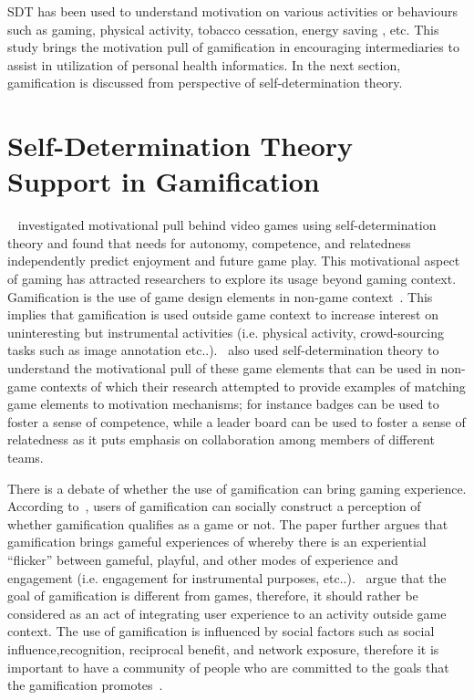 SDT has been used to understand motivation on various activities or behaviours such as gaming\citep{ryan2006:motivationalpull}, physical activity\citep{power2011:obesity}, tobacco cessation\citep{williams2006:testing}, energy saving \citep{webb2013:self}, etc. This study brings the motivation pull of gamification in encouraging intermediaries to assist in utilization of personal health informatics. In the next section, gamification is discussed from perspective of self-determination theory.
\section{Self-Determination Theory Support in Gamification}
~\cite{ryan2006:motivationalpull} investigated motivational pull behind video games using self-determination theory and found that needs for autonomy, competence, and relatedness independently predict enjoyment and future game play. This motivational aspect of gaming has attracted researchers to explore its usage beyond gaming context. Gamification is the use of game design elements in non-game context~\citep{deterding2011game}. This implies that gamification is used outside game context to increase interest on uninteresting but instrumental activities (i.e. physical activity, crowd-sourcing tasks such as image annotation etc..).~\cite{sailer2013:psychological} also used self-determination theory to understand the motivational pull of these game elements that can be used in non-game contexts of which their research attempted to provide examples of matching game elements to motivation mechanisms; for instance badges can be used to foster a sense of competence, while a leader board can be used to foster a sense of relatedness as it puts emphasis on collaboration among members of different teams.

There is a debate of whether the use of gamification can bring gaming experience. According to~\cite{deterding2011game}, users of gamification can socially construct a perception of whether gamification qualifies as a game or not. The paper further argues that gamification brings gameful experiences of whereby there is an experiential ``flicker'' between gameful, playful, and other modes of experience and engagement (i.e. engagement for instrumental purposes, etc..).~\cite{seaborn2015:gamification} argue that the goal of gamification is different from games, therefore, it should rather be considered as an act of integrating user experience to an activity outside game context. The use of gamification is influenced by social factors such as social influence,recognition, reciprocal benefit, and network exposure, therefore it is important to have a community of people who are committed to the goals that the gamification promotes~\citep{hamari2013social}.

